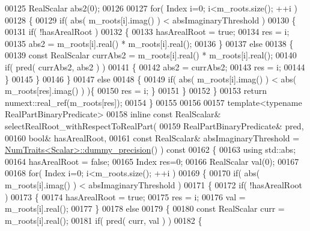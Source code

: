 \begin{DoxyCode}
00125       RealScalar abs2(0);
00126 
00127       \textcolor{keywordflow}{for}( Index i=0; i<m\_roots.size(); ++i )
00128       \{
00129         \textcolor{keywordflow}{if}( abs( m\_roots[i].imag() ) < absImaginaryThreshold )
00130         \{
00131           \textcolor{keywordflow}{if}( !hasArealRoot )
00132           \{
00133             hasArealRoot = \textcolor{keyword}{true};
00134             res = i;
00135             abs2 = m\_roots[i].real() * m\_roots[i].real();
00136           \}
00137           \textcolor{keywordflow}{else}
00138           \{
00139             \textcolor{keyword}{const} RealScalar currAbs2 = m\_roots[i].real() * m\_roots[i].real();
00140             \textcolor{keywordflow}{if}( pred( currAbs2, abs2 ) )
00141             \{
00142               abs2 = currAbs2;
00143               res = i;
00144             \}
00145           \}
00146         \}
00147         \textcolor{keywordflow}{else}
00148         \{
00149           \textcolor{keywordflow}{if}( abs( m\_roots[i].imag() ) < abs( m\_roots[res].imag() ) )\{
00150             res = i; \}
00151         \}
00152       \}
00153       \textcolor{keywordflow}{return} numext::real\_ref(m\_roots[res]);
00154     \}
00155 
00156 
00157     \textcolor{keyword}{template}<\textcolor{keyword}{typename} RealPartBinaryPredicate>
00158     \textcolor{keyword}{inline} \textcolor{keyword}{const} RealScalar& selectRealRoot\_withRespectToRealPart(
00159         RealPartBinaryPredicate& pred,
00160         \textcolor{keywordtype}{bool}& hasArealRoot,
00161         \textcolor{keyword}{const} RealScalar& absImaginaryThreshold = 
      \hyperlink{group___core___module_struct_eigen_1_1_num_traits}{NumTraits<Scalar>::dummy\_precision}() )\textcolor{keyword}{ const}
00162 \textcolor{keyword}{    }\{
00163       \textcolor{keyword}{using} std::abs;
00164       hasArealRoot = \textcolor{keyword}{false};
00165       Index res=0;
00166       RealScalar val(0);
00167 
00168       \textcolor{keywordflow}{for}( Index i=0; i<m\_roots.size(); ++i )
00169       \{
00170         \textcolor{keywordflow}{if}( abs( m\_roots[i].imag() ) < absImaginaryThreshold )
00171         \{
00172           \textcolor{keywordflow}{if}( !hasArealRoot )
00173           \{
00174             hasArealRoot = \textcolor{keyword}{true};
00175             res = i;
00176             val = m\_roots[i].real();
00177           \}
00178           \textcolor{keywordflow}{else}
00179           \{
00180             \textcolor{keyword}{const} RealScalar curr = m\_roots[i].real();
00181             \textcolor{keywordflow}{if}( pred( curr, val ) )
00182             \{

\end{DoxyCode}
